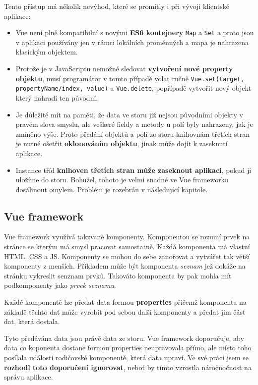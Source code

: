 Tento přístup má několik nevýhod, které se promítly i při vývoji klientské aplikace:
\begin{itemize}
  \item Vue není plně kompatibilní s novými \textbf{ES6 kontejnery} \texttt{Map} a \texttt{Set} a proto jsou v aplikaci používány jen v rámci lokálních proměnných a mapa je nahrazena klasickým objektem.
  \item Protože je v JavaScriptu nemožné sledovat \textbf{vytvoření nové property objektu}, musí programátor v tomto případě volat ručně \texttt{Vue.set(target, propertyName/index, value)} a \texttt{Vue.delete}, popřípadě vytvořit nový objekt který nahradí ten původní.
  \item Je důležité mít na paměti, že data ve storu již nejsou původními objekty v pravém slova smyslu, ale veškeré fieldy a metody u polí byly nahrazeny, jak je zmíněno výše. Proto předání objektů a polí ze storu knihovnám třetích stran je nutné ošetřit \textbf{oklonováním objektu}, jinak může dojít k zaseknutí aplikace.
  \item Instance tříd \textbf{knihoven třetích stran může zaseknout aplikaci}, pokud ji uložíme do storu. Bohužel, tohoto je velmi snadné ve Vue frameworku dosáhnout omylem. Problém je rozebrán v následující kapitole.
\end{itemize}

\subsection{Vue framework}
Vue framework využívá takzvané komponenty. Komponentou se rozumí prvek na stránce se kterým má smysl pracovat samostatně. Každá komponenta má vlastní HTML, CSS a JS. Komponenty se mohou do sebe zanořovat a vytvářet tak větší komponenty z menších. Příkladem může být komponenta \textit{seznam} jež dokáže na stránku vykreslit senznam prvků. Takováto komponenta by pak mohla mít podkomponenty jako \textit{prvek seznamu}.

Každé komponentě lze předat data formou \textbf{properties} přičemž komponenta na základě těchto dat může vyrobit pod sebou další komponenty a předat jim část dat, která dostala.

Tyto předávána data jsou právě data ze storu. Vue framework doporučuje, aby data co koponenta dostane formou properties neupravovala přímo, ale místo toho posílala události rodičovské komponentě, která data upraví. Ve své práci jsem se \textbf{rozhodl toto doporučení ignorovat}, neboť by tímto vzrostla náročnočnost na správu aplikace.

